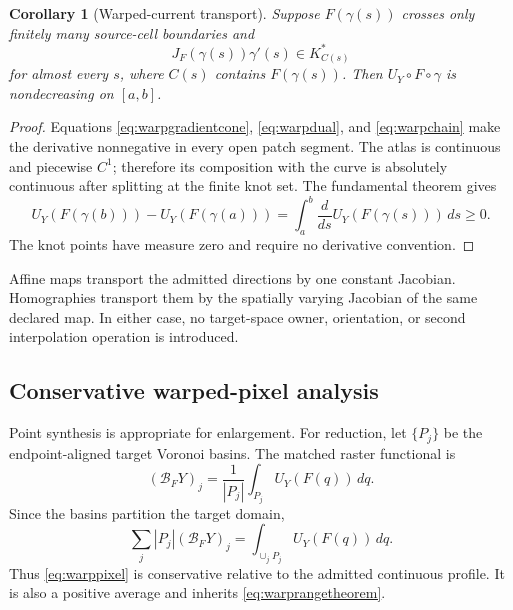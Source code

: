 \documentclass[journal]{IEEEtran}
\newtheorem{corollary}{Corollary}
\begin{document}
\begin{corollary}[Warped-current transport]
Suppose \(F(\gamma(s))\) crosses only finitely many source-cell boundaries
and
\begin{equation}
 J_F(\gamma(s))\gamma'(s)\in K_{C(s)}^*
 \label{eq:warptangentcondition}
\end{equation}
for almost every \(s\), where \(C(s)\) contains \(F(\gamma(s))\).  Then
\(U_Y\circ F\circ\gamma\) is nondecreasing on \([a,b]\).
\end{corollary}

\begin{proof}
Equations \eqref{eq:warpgradientcone}, \eqref{eq:warpdual}, and
\eqref{eq:warpchain} make the derivative nonnegative in every open patch
segment.  The atlas is continuous and piecewise \(C^1\); therefore its
composition with the curve is absolutely continuous after splitting at the
finite knot set.  The fundamental theorem gives
\begin{equation}
 U_Y(F(\gamma(b)))-U_Y(F(\gamma(a)))
 =\int_a^b\frac{d}{ds}U_Y(F(\gamma(s)))\,ds\geq0.
\end{equation}
The knot points have measure zero and require no derivative convention.
\end{proof}

Affine maps transport the admitted directions by one constant Jacobian.
Homographies transport them by the spatially varying Jacobian of the same
declared map.  In either case, no target-space owner, orientation, or second
interpolation operation is introduced.

\subsection{Conservative warped-pixel analysis}

Point synthesis is appropriate for enlargement.  For reduction, let
\(\{P_j\}\) be the endpoint-aligned target Voronoi basins.  The matched
raster functional is
\begin{equation}
 (\mathcal B_FY)_j=
 \frac{1}{|P_j|}\int_{P_j}U_Y(F(q))\,dq.
 \label{eq:warppixel}
\end{equation}
Since the basins partition the target domain,
\begin{equation}
 \sum_j|P_j|(\mathcal B_FY)_j
 =\int_{\cup_jP_j}U_Y(F(q))\,dq.
 \label{eq:warpconservation}
\end{equation}
Thus \eqref{eq:warppixel} is conservative relative to the admitted continuous
profile.  It is also a positive average and inherits
\eqref{eq:warprangetheorem}.
\end{document}
